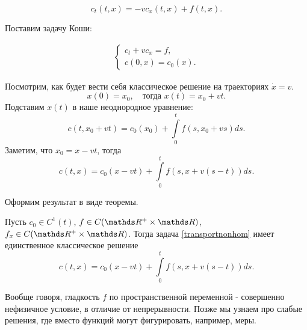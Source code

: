 $$ c_t (t, x) = - vc_x (t, x) + f(t, x). $$

Поставим задачу Коши:

\begin{align}
    \begin{cases} 
        c_t + v c_x = f, \\
        c (0, x) = c_0 (x).
    \end{cases}
\label{transportnonhom}
\end{align}

Посмотрим, как будет вести себя классическое решение на траекториях $ \dot x = v $.
\[
	x(0) = x_0,\quad \text{тогда } x(t) = x_0 + v t .
\]
Подставим $x(t)$ в наше неоднородное уравнение:
$$ c (t, x_0 + vt) = c_0 (x_0) + \int \limits_0^t f(s, x_0 + vs) ds. $$
Заметим, что $ x_0 = x - vt $, тогда
$$ c (t, x) = c_0 (x - vt) + \int \limits_0^t f(s, x + v(s-t)) ds. $$

Оформим результат  в виде теоремы.

\begin{theorem}
Пусть $c_0 \in C^1(t)$, $f \in C (\real^+ \times \real)$, $f_x \in C (\real^+ \times \real)$. Тогда задача \eqref{transportnonhom} имеет единственное классическое решение $$ c (t, x) = c_0 (x - vt) + \int \limits_0^t f(s, x + v(s-t)) ds .$$
\end{theorem}

Вообще говоря, гладкость $f$ по пространственной переменной - совершенно нефизичное условие, в отличие от непрерывности. Позже мы узнаем про слабые решения, где вместо функций могут фигурировать, например, меры.